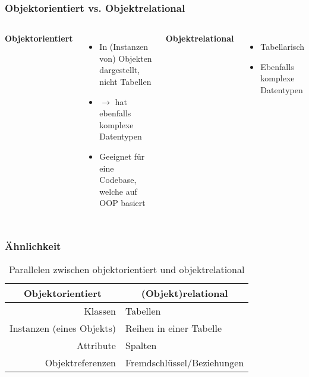 \begin{frame}
    \frametitle{Objektorientiert vs. Objektrelational}
    \pause
    \begin{columns}[T,onlytextwidth]
            \textbf{Objektorientiert}
            \pause
            \begin{itemize}
                \item In (Instanzen von) Objekten dargestellt, nicht Tabellen \pause
                \item $\rightarrow$ hat ebenfalls komplexe Datentypen \pause
                \item Geeignet für eine Codebase, welche auf OOP basiert \pause
            \end{itemize}

            \textbf{Objektrelational}
            \pause
            \begin{itemize}
                \item Tabellarisch
                \item Ebenfalls komplexe Datentypen
            \end{itemize}
    \end{columns}
\end{frame}

\begin{frame}
    \frametitle{Ähnlichkeit}

    \begin{table}
        \begin{small}
            \label{tab:OODBvsORDB}
            \begin{center}
                \begin{tabular}[c]{|r|l|}
                    \hline
                    \multicolumn{1}{|c|}{\textbf{Objektorientiert}} &
                    \multicolumn{1}{c|}{\textbf{(Objekt)relational}} \\
                    \hline
                    Klassen                   & Tabellen \\
                    Instanzen (eines Objekts) & Reihen in einer Tabelle \\
                    Attribute                 & Spalten \\
                    Objektreferenzen          & Fremdschlüssel/Beziehungen \\
                    \hline
                \end{tabular}
            \end{center}
            \caption{Parallelen zwischen objektorientiert und objektrelational}
        \end{small}
    \end{table}

\end{frame}
